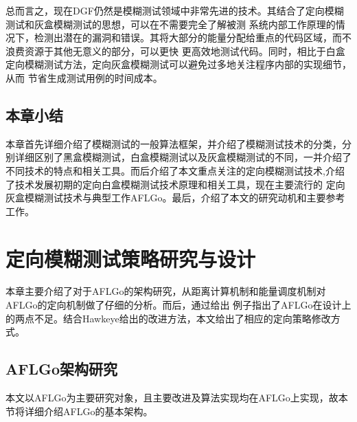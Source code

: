 \documentclass[bachelor]{njupthesis}
\begin{document}
总而言之，现在DGF仍然是模糊测试领域中非常先进的技术。其结合了定向模糊测试和灰盒模糊测试的思想，可以在不需要完全了解被测
系统内部工作原理的情况下，检测出潜在的漏洞和错误。其将大部分的能量分配给重点的代码区域，而不浪费资源于其他无意义的部分，可以更快
更高效地测试代码。同时，相比于白盒定向模糊测试方法，定向灰盒模糊测试可以避免过多地关注程序内部的实现细节，从而
节省生成测试用例的时间成本。

\section{本章小结}
本章首先详细介绍了模糊测试的一般算法框架，并介绍了模糊测试技术的分类，分别详细区别了黑盒模糊测试，白盒模糊测试以及灰盒模糊测试的不同，一并介绍了
不同技术的特点和相关工具。而后介绍了本文重点关注的定向模糊测试技术,介绍了技术发展初期的定向白盒模糊测试技术原理和相关工具，现在主要流行的
定向灰盒模糊测试技术与典型工作AFLGo。最后，介绍了本文的研究动机和主要参考工作。

\chapter{定向模糊测试策略研究与设计}
本章主要介绍了对于AFLGo的架构研究，从距离计算机制和能量调度机制对AFLGo的定向机制做了仔细的分析。而后，通过给出
例子指出了AFLGo在设计上的两点不足。结合Hawkeye给出的改进方法，本文给出了相应的定向策略修改方式。
\section{AFLGo架构研究}\label{sec:AFLGo}
本文以AFLGo为主要研究对象，且主要改进及算法实现均在AFLGo上实现，故本节将详细介绍AFLGo的基本架构。
\end{document}
